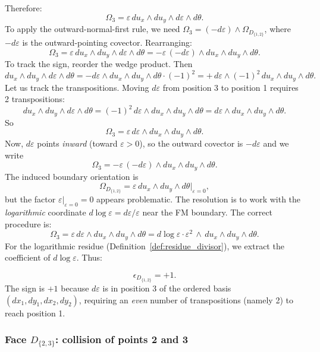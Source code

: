 Therefore:
\[
\Omega_3 = \varepsilon\, du_x\wedge du_y\wedge d\varepsilon\wedge d\theta.
\]
To apply the outward-normal-first rule, we need $\Omega_3 = (-d\varepsilon)\wedge\Omega_{D_{\{1,2\}}}$, where $-d\varepsilon$ is the outward-pointing covector. Rearranging:
\[
\Omega_3 = \varepsilon\,du_x\wedge du_y\wedge d\varepsilon\wedge d\theta = -\varepsilon\,(-d\varepsilon)\wedge du_x\wedge du_y\wedge d\theta.
\]
To track the sign, reorder the wedge product. Then
\[
du_x\wedge du_y\wedge d\varepsilon\wedge d\theta = -d\varepsilon\wedge du_x\wedge du_y\wedge d\theta \cdot (-1)^2 = +\,d\varepsilon\wedge (-1)^2\, du_x\wedge du_y\wedge d\theta.
\]
Let us track the transpositions. Moving $d\varepsilon$ from position 3 to position 1 requires 2 transpositions:
\[
du_x\wedge du_y \wedge d\varepsilon\wedge d\theta = (-1)^2\,d\varepsilon\wedge du_x\wedge du_y\wedge d\theta = d\varepsilon\wedge du_x\wedge du_y\wedge d\theta.
\]
So
\[
\Omega_3 = \varepsilon\,d\varepsilon\wedge du_x\wedge du_y\wedge d\theta.
\]
Now, $d\varepsilon$ points \emph{inward} (toward $\varepsilon > 0$), so the outward covector is $-d\varepsilon$ and we write
\[
\Omega_3 = -\varepsilon\,(-d\varepsilon)\wedge du_x\wedge du_y\wedge d\theta.
\]
The induced boundary orientation is
\[
\Omega_{D_{\{1,2\}}} = \varepsilon\,du_x\wedge du_y\wedge d\theta\Big|_{\varepsilon=0},
\]
but the factor $\varepsilon|_{\varepsilon=0} = 0$ appears problematic. The resolution is to work with the \emph{logarithmic} coordinate $d\log\varepsilon = d\varepsilon/\varepsilon$ near the FM boundary. The correct procedure is:
\[
\Omega_3 = \varepsilon\,d\varepsilon\wedge du_x\wedge du_y\wedge d\theta = d\log\varepsilon \cdot \varepsilon^2\, \wedge\, du_x\wedge du_y\wedge d\theta.
\]
For the logarithmic residue (Definition~\ref{def:residue_divisor}), we extract the coefficient of $d\log\varepsilon$. Thus:

\begin{equation}
\label{eq:eps-D12}
\boxed{\epsilon_{D_{\{1,2\}}} = +1.}
\end{equation}
The sign is $+1$ because $d\varepsilon$ is in position 3 of the ordered basis $(dx_1,dy_1,dx_2,dy_2)$, requiring an \emph{even} number of transpositions (namely 2) to reach position 1.

\subsubsection{\texorpdfstring{Face $D_{\{2,3\}}$: collision of points 2 and 3}{Face D23: collision of points 2 and 3}}

